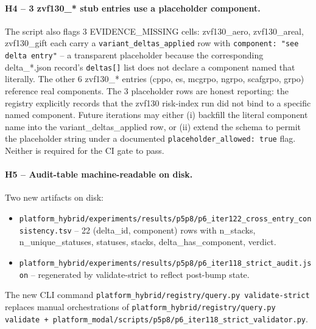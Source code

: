 \paragraph{H4 -- 3 zvf130\_* stub entries use a placeholder component.}
The script also flags 3 EVIDENCE\_MISSING cells: zvf130\_aero,
zvf130\_areal, zvf130\_gift each carry a \texttt{variant\_deltas\_applied}
row with \texttt{component: "see delta entry"} -- a transparent
placeholder because the corresponding delta\_*.json record's
\texttt{deltas[]} list does not declare a component named that
literally. The other 6 zvf130\_* entries
(cppo, es, mcgrpo, ngrpo, scafgrpo, grpo) reference real components.
The 3 placeholder rows are honest reporting: the registry explicitly
records that the zvf130 risk-index run did not bind to a specific named
component. Future iterations may either (i) backfill the literal
component name into the variant\_deltas\_applied row, or (ii) extend
the schema to permit the placeholder string under a documented
\texttt{placeholder\_allowed: true} flag. Neither is required for the
CI gate to pass.

\paragraph{H5 -- Audit-table machine-readable on disk.}
Two new artifacts on disk:
\begin{itemize}
\item \texttt{platform_hybrid/experiments/results/p5p8/p6\_iter122\_cross\_entry\_consistency.tsv}
      -- 22 (delta\_id, component) rows with n\_stacks, n\_unique\_statuses,
      statuses, stacks, delta\_has\_component, verdict.
\item \texttt{platform_hybrid/experiments/results/p5p8/p6\_iter118\_strict\_audit.json}
      -- regenerated by validate-strict to reflect post-bump state.
\end{itemize}
The new CLI command \texttt{platform_hybrid/registry/query.py validate-strict} replaces
manual orchestrations of \texttt{platform_hybrid/registry/query.py validate +
platform_modal/scripts/p5p8/p6\_iter118\_strict\_validator.py}.

